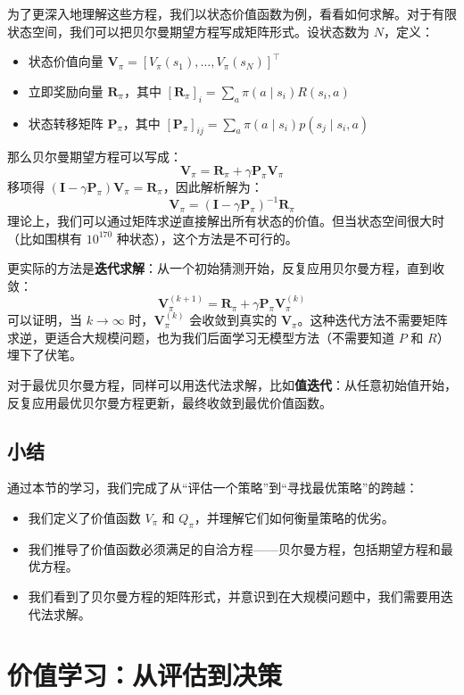 \documentclass[lang=cn,zihao=-4,a4paper,fontset=windows]{beautybook}
\begin{document}
为了更深入地理解这些方程，我们以状态价值函数为例，看看如何求解。对于有限状态空间，我们可以把贝尔曼期望方程写成矩阵形式。设状态数为 $N$，定义：
\begin{itemize}
    \item 状态价值向量 $\mathbf{V}_\pi = [V_\pi(s_1), \dots, V_\pi(s_N)]^\top$
    \item 立即奖励向量 $\mathbf{R}_\pi$，其中 $[\mathbf{R}_\pi]_i = \sum_a \pi(a\mid s_i) R(s_i, a)$
    \item 状态转移矩阵 $\mathbf{P}_\pi$，其中 $[\mathbf{P}_\pi]_{ij} = \sum_a \pi(a\mid s_i) p(s_j \mid s_i, a)$
\end{itemize}
那么贝尔曼期望方程可以写成：
\[
\mathbf{V}_\pi = \mathbf{R}_\pi + \gamma \mathbf{P}_\pi \mathbf{V}_\pi
\]
移项得 $(\mathbf{I} - \gamma \mathbf{P}_\pi) \mathbf{V}_\pi = \mathbf{R}_\pi$，因此解析解为：
\[
\mathbf{V}_\pi = (\mathbf{I} - \gamma \mathbf{P}_\pi)^{-1} \mathbf{R}_\pi
\]
理论上，我们可以通过矩阵求逆直接解出所有状态的价值。但当状态空间很大时（比如围棋有 $10^{170}$ 种状态），这个方法是不可行的。

更实际的方法是\textbf{迭代求解}：从一个初始猜测开始，反复应用贝尔曼方程，直到收敛：
\[
\mathbf{V}_\pi^{(k+1)} = \mathbf{R}_\pi + \gamma \mathbf{P}_\pi \mathbf{V}_\pi^{(k)}
\]
可以证明，当 $k \to \infty$ 时，$\mathbf{V}_\pi^{(k)}$ 会收敛到真实的 $\mathbf{V}_\pi$。这种迭代方法不需要矩阵求逆，更适合大规模问题，也为我们后面学习无模型方法（不需要知道 $P$ 和 $R$）埋下了伏笔。

对于最优贝尔曼方程，同样可以用迭代法求解，比如\textbf{值迭代}：从任意初始值开始，反复应用最优贝尔曼方程更新，最终收敛到最优价值函数。

\subsection{小结}

通过本节的学习，我们完成了从“评估一个策略”到“寻找最优策略”的跨越：
\begin{itemize}
    \item 我们定义了价值函数 $V_\pi$ 和 $Q_\pi$，并理解它们如何衡量策略的优劣。
    \item 我们推导了价值函数必须满足的自洽方程——贝尔曼方程，包括期望方程和最优方程。
    \item 我们看到了贝尔曼方程的矩阵形式，并意识到在大规模问题中，我们需要用迭代法求解。
\end{itemize}

\section{价值学习：从评估到决策}
\end{document}
